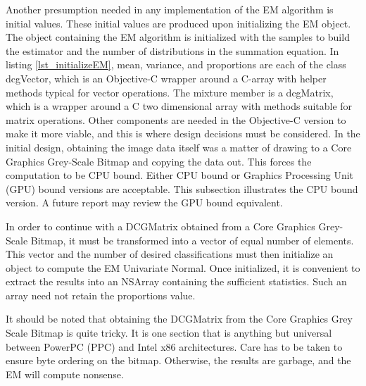 \documentclass[11pt]{article}
\begin{document}
Another presumption needed in any implementation of the EM algorithm is initial values.  %
These initial values are produced upon initializing the EM object.  The object containing the EM algorithm is initialized with the samples to build the estimator and the number of distributions in the summation equation.  In listing \ref{lst_initializeEM}, mean, variance, and proportions are each of the class dcgVector, which is an Objective-C wrapper around a C-array with helper methods typical for vector operations.  The mixture member is a dcgMatrix, which is a wrapper around a C two dimensional array with methods suitable for matrix operations.  
Other components are needed in the Objective-C version to make it more viable, and this is where design decisions must be considered.   In the initial design, obtaining the image data itself was a matter of drawing to a Core Graphics Grey-Scale Bitmap and copying the data out.   This forces the computation to be CPU bound.  Either CPU bound or Graphics Processing Unit (GPU) bound versions are acceptable.   This subsection illustrates the CPU bound version.   A future report may review the GPU bound equivalent.  

In order to continue with a DCGMatrix obtained from a Core Graphics Grey-Scale Bitmap, it must be transformed into a vector of equal number of elements.  This vector and the number of desired classifications must then initialize an object to compute the EM Univariate Normal.    Once initialized, it is convenient to extract the results into an NSArray containing the sufficient statistics.  Such an array need not retain the proportions value.  


It should be noted that obtaining the DCGMatrix from the Core Graphics Grey Scale Bitmap is quite tricky.  It is one section that is anything but universal between PowerPC (PPC) and Intel x86 architectures.   Care has to be taken to ensure byte ordering on the bitmap.  Otherwise, the results are garbage, and the EM will compute nonsense.  
\end{document}
